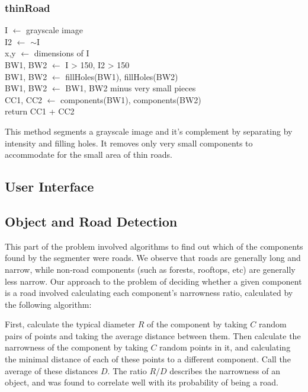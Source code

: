 \documentclass[12pt]{article}
\begin{document}
\subsubsection*{thinRoad}
\begin{addmargin}[12em]{1em}
	I $\leftarrow$ grayscale image \\
	I2 $\leftarrow$ $\sim$I \\
	x,y $\leftarrow$ dimensions of I \\
	BW1, BW2 $\leftarrow$ I > 150, I2 > 150 \\
	BW1, BW2 $\leftarrow$ fillHoles(BW1), fillHoles(BW2) \\
	BW1, BW2 $\leftarrow$ BW1, BW2 minus very small pieces \\
	CC1, CC2 $\leftarrow$ components(BW1), components(BW2) \\
	return CC1 + CC2 \\
\end{addmargin}
This method segments a grayscale image and it's complement by separating by intensity and filling holes. It removes only very small components to accommodate for the small area of thin roads.

\subsection*{User Interface}

\subsection*{Object and Road Detection}
This part of the problem involved algorithms to find out which of the components found by the segmenter were roads. We observe that roads are generally long and narrow, while non-road components (such as forests, rooftops, etc) are generally less narrow. Our approach to the problem of deciding whether a given component is a road involved calculating each component's narrowness ratio, calculated by the following algorithm:

First, calculate the typical diameter $R$ of the component by taking $C$ random pairs of points and taking the average distance between them. Then calculate the narrowness of the component by taking $C$ random points in it, and calculating the minimal distance of each of these points to a different component. Call the average of these distances $D$. The ratio $R/D$ describes the narrowness of an object, and was found to correlate well with its probability of being a road.
\end{document}
